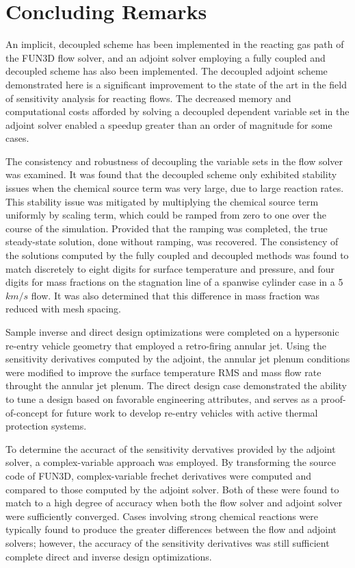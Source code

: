 \chapter{Concluding Remarks}
\label{chapter-ten}

An implicit, decoupled scheme has been implemented in the reacting gas path of
the FUN3D flow solver, and an adjoint solver employing a fully coupled and
decoupled scheme has also been implemented.  The decoupled adjoint scheme
demonstrated here is a significant improvement to the state of the art in the
field of sensitivity analysis for reacting flows.  The decreased memory and
computational costs afforded by solving a decoupled dependent variable set in
the adjoint solver enabled a speedup greater than an order of magnitude for some
cases.  

The consistency and robustness of decoupling the variable sets in the flow
solver was examined.  It was found that the decoupled scheme only exhibited
stability issues when the chemical source term was very large, due to large
reaction rates.  This stability issue was mitigated by multiplying the chemical
source term uniformly by scaling term, which could be ramped from zero to one
over the course of the simulation.  Provided that the ramping was completed, the
true steady-state solution, done without ramping, was recovered.  The
consistency of the solutions computed by the fully coupled and decoupled methods
was found to match discretely to eight digits for surface temperature and pressure,
and four digits for mass fractions on the stagnation line of a spanwise
cylinder case in a 5 $km/s$ flow.  It was also determined that this difference
in mass fraction was reduced with mesh spacing.

Sample inverse and direct design optimizations were completed on a hypersonic
re-entry vehicle geometry that employed a retro-firing annular jet.  Using the
sensitivity derivatives computed by the adjoint, the annular jet plenum
conditions were modified to improve the surface temperature RMS and mass flow
rate throught the annular jet plenum.  The direct design case demonstrated the
ability to tune a design based on favorable engineering attributes, and serves
as a proof-of-concept for future work to develop re-entry vehicles with active
thermal protection systems.

To determine the accuract of the sensitivity dervatives provided by the adjoint
solver, a complex-variable approach was employed.  By transforming the source
code of FUN3D, complex-variable frechet derivatives were computed and compared
to those computed by the adjoint solver.  Both of these were found to match to a
high degree of accuracy when both the flow solver and adjoint solver were
sufficiently converged.  Cases involving strong chemical reactions were
typically found to produce the greater differences between the flow and adjoint
solvers; however, the accuracy of the sensitivity derivatives was still
sufficient complete direct and inverse design optimizations.

